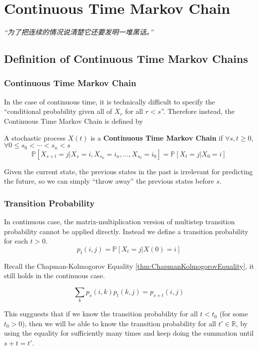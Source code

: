 \chapter{Continuous Time Markov Chain}
\emph{“为了把连续的情况说清楚它还要发明一堆黑话。”}
\newpage


\section{Definition of Continuous Time Markov Chains}
    \subsection{Continuous Time Markov Chain}
        In the case of continuous time, it is technically difficult to specify the ``conditional probability given all of $X_r$ for all $r<s$''. Therefore instead, the Continuous Time Markov Chain is defined by

        \begin{definition}\label{def:ContinuousTimeMarkovChain}
            A stochastic process $X(t)$ is a \textbf{Continuous Time Markov Chain} if $\forall s,t \ge 0$, $\forall 0 \le s_0 < \cdots < s_n < s$
            \[ \mathbb{P}[X_{s+t} = j | X_s = i, X_{s_n} = i_n,\dots,X_{s_0}=i_0] = \mathbb{P}[X_t=j | X_0 = i] \]
        \end{definition}

        Given the current state, the previous states in the past is irrelevant for predicting the future, so we can simply ``throw away'' the previous states before $s$.

    \subsection{Transition Probability}
        In continuous case, the matrix-multiplication version of multistep transition probability cannot be applied directly. Instead we define a transition probability for each $t>0$.
        \[ p_t(i,j) = \mathbb{P}[X_t=j|X(0)=i] \]

        Recall the Chapman-Kolmogorov Equality \ref{thm:ChapmanKolmogorovEquality}, it still holds in the continuous case.

        \begin{theorem}\label{thm:ContinuousChapmanKolmogorovEquality}
            \[ \sum_{k}p_s(i,k)p_t(k,j) = p_{s+t}(i,j) \]
        \end{theorem}
        \begin{remark}
            This sugguests that if we know the transition probability for all $t<t_0$ (for some $t_0>0$), then we will be able to know the transition probability for all $t' \in \mathbb{R}$, by using the equality for sufficiently many times and keep doing the summation until $s+t=t'$.
        \end{remark}

